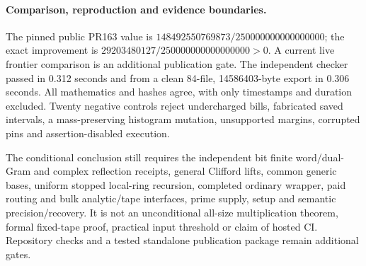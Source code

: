 \documentclass[11pt]{article}
\begin{document}
\paragraph{Comparison, reproduction and evidence boundaries.}
The pinned public PR163 value is
$148492550769873/250000000000000000$; the exact improvement is
$29203480127/250000000000000000>0$. A current live frontier comparison
is an additional publication gate. The independent checker passed in
0.312 seconds and from a clean 84-file, 14586403-byte export in
0.306 seconds. All mathematics and hashes agree, with only timestamps
and duration excluded. Twenty negative controls reject undercharged
bills, fabricated saved intervals, a mass-preserving histogram mutation,
unsupported margins, corrupted pins and assertion-disabled execution.

The conditional conclusion still requires the independent bit finite
word/dual-Gram and complex reflection receipts, general Clifford lifts,
common generic bases, uniform stopped local-ring recursion, completed
ordinary wrapper, paid routing and bulk analytic/tape interfaces, prime
supply, setup and semantic precision/recovery. It is not an unconditional
all-size multiplication theorem, formal fixed-tape proof, practical input
threshold or claim of hosted CI. Repository checks and a tested standalone
publication package remain additional gates.
\end{document}
